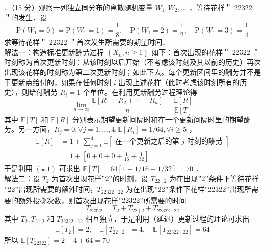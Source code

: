 \documentclass[UTF8,openany]{book}
\begin{document}
．（15 分）观察一列独立同分布的离散随机变量 $W_{1}, W_{2}, \ldots$ ，等待花样＂ 22322 ＂的发生．设
$$
\mathrm{P}\left(W_{1}=0\right)=\mathrm{P}\left(W_{1}=1\right)=\frac{1}{8}, \quad \mathrm{P}\left(W_{1}=2\right)=\frac{1}{2}, \quad \mathrm{P}\left(W_{1}=3\right)=\frac{1}{4}
$$
求等待花样＂ 22322 ＂首次发生所需要的期望时间．\\
解法一：构造标准更新酬劳过程 $\left\{X_{n}, n \geq 1\right\}$ 如下：首次出现的花样＂ 22322 ＂时刻称为首次更新时刻：从该时刻以后开始（不考虑该时刻及其以前的历史）再次出现该花样的时刻称为第二次更新时刻；如此下去。每个更新区间里的酬劳并不是于更新点给付的，如果在任何时刻 $i$ 出现上述花样（此时考虑该时刻所有的历史），则给付酬劳 $R_{i}=1$ 个单位。在利用更新酬劳过程理论得
\begin{equation*}
	\lim _{n \rightarrow \infty} \frac{\mathbb{E}\left[R_{1}+R_{2}+\cdots+R_{n}\right]}{n}=\frac{\mathbb{E} [R]}{\mathbb{E} [T]} \tag{$\star$.1}
\end{equation*}
其中 $\mathbb{E} [T]$ 和 $\mathbb{E} [R]$ 分别表示期望更新间隔时和在一个更新间隔时里的期望酬劳。另一方面，$R_{j}=0, \forall j=1, \ldots, 4 ; \mathbb{E} [R_{i}]=1 / 64, \forall i \geq 5$ ，
$$
\begin{aligned}
	\mathbb{E} [R] & =1+\sum_{j=1}^{4} \mathbb{E}[\text { 在一个更新之后的第 } j \text { 时刻的酬劳 }] \\
	& =1+\left[0+0+0+\frac{1}{16}+\frac{1}{32}\right]
\end{aligned}
$$
于是利用 $(\star .1)$ 可求出 $\mathbb{E} [T]=64[1+1 / 16+1 / 32]=70$ ．\\
解法二：设 $T_{2}$ 为首次出现花样$"2"$的时刻，设 $T_{22 \mid 2}$ 为在出现$"2"$条件下等待花样$"22"$出现所需要的额外时间，$T_{22322 \mid 22}$ 为在出现$"22"$条件下花样$"22322"$出现所需要的额外投掷次数，则首次出现花样$"22322"$所需要的时间
$$
T_{22322}=T_{2}+T_{22 \mid 2}+T_{22322 \mid 22}
$$
其中 $T_{2}, T_{2 \mid 2}$ 和 $T_{22322 \mid 22}$ 相互独立．于是利用（延迟）更新过程的理论可求出
$$
\mathbb{E} [T_{2}]=2, \quad \mathbb{E} [T_{22 \mid 2}]=4, \quad \mathbb{E} [T_{22322 \mid 22}]=64
$$
所以 $\mathbb{E}[T_{22322}]=2+4+64=70$\\
\newpage
\end{document}
